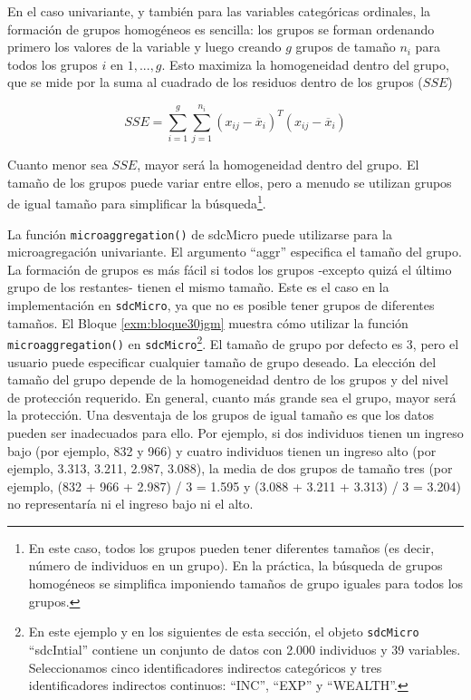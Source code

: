 \documentclass[]{book}
\theoremstyle{definition}
\theoremstyle{definition}
\theoremstyle{definition}
\theoremstyle{definition}
\theoremstyle{remark}
\begin{document}
En el caso univariante, y también para las variables categóricas ordinales, la formación de grupos homogéneos es sencilla: los grupos se forman ordenando primero los valores de la variable y luego creando \(g\) grupos de tamaño \(n_i\) para todos los grupos \(i\) en \(1, ..., g\). Esto maximiza la homogeneidad dentro del grupo, que se mide por la suma al cuadrado de los residuos dentro de los grupos (\(SSE\))

\[
SSE = \sum_{i = 1}^{g}{\sum_{j = 1}^{n_{i}}{\left( x_{ij} - {\overline{x}}_{i} \right)^{T}\left( x_{ij} - {\overline{x}}_{i} \right)}}
\]

Cuanto menor sea \(SSE\), mayor será la homogeneidad dentro del grupo. El tamaño de los grupos puede variar entre ellos, pero a menudo se utilizan grupos de igual tamaño para simplificar la búsqueda\footnote{En este caso, todos los grupos pueden tener diferentes tamaños (es decir, número de individuos en un grupo). En la práctica, la búsqueda de grupos homogéneos se simplifica imponiendo tamaños de grupo iguales para todos los grupos.}.

La función \texttt{microaggregation()} de sdcMicro puede utilizarse para la microagregación univariante. El argumento ``aggr'' especifica el tamaño del grupo. La formación de grupos es más fácil si todos los grupos -excepto quizá el último grupo de los restantes- tienen el mismo tamaño. Este es el caso en la implementación en \texttt{sdcMicro}, ya que no es posible tener grupos de diferentes tamaños. El Bloque \ref{exm:bloque30jgm} muestra cómo utilizar la función \texttt{microaggregation()} en \texttt{sdcMicro}\footnote{En este ejemplo y en los siguientes de esta sección, el objeto \texttt{sdcMicro} ``sdcIntial'' contiene un conjunto de datos con 2.000 individuos y 39 variables. Seleccionamos cinco identificadores indirectos categóricos y tres identificadores indirectos continuos: ``INC'', ``EXP'' y ``WEALTH''.}. El tamaño de grupo por defecto es 3, pero el usuario puede especificar cualquier tamaño de grupo deseado. La elección del tamaño del grupo depende de la homogeneidad dentro de los grupos y del nivel de protección requerido. En general, cuanto más grande sea el grupo, mayor será la protección. Una desventaja de los grupos de igual tamaño es que los datos pueden ser inadecuados para ello. Por ejemplo, si dos individuos tienen un ingreso bajo (por ejemplo, 832 y 966) y cuatro individuos tienen un ingreso alto (por ejemplo, 3.313, 3.211, 2.987, 3.088), la media de dos grupos de tamaño tres (por ejemplo, (832 + 966 + 2.987) / 3 = 1.595 y (3.088 + 3.211 + 3.313) / 3 = 3.204) no representaría ni el ingreso bajo ni el alto.
\end{document}
